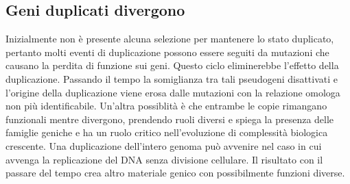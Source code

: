 \subsection{Geni duplicati divergono}
Inizialmente non \`e presente alcuna selezione per mantenere lo stato duplicato, pertanto molti eventi di duplicazione possono essere seguiti da mutazioni che causano la perdita di 
funzione sui geni. Questo ciclo eliminerebbe l'effetto della duplicazione. Passando il tempo la somiglianza tra tali pseudogeni disattivati e l'origine della duplicazione 
viene erosa dalle mutazioni con la relazione omologa non pi\`u identificabile. Un'altra possiblit\`a \`e che entrambe le copie rimangano funzionali mentre divergono, prendendo ruoli 
diversi e spiega la presenza delle famiglie geniche e ha un ruolo critico nell'evoluzione di complessit\`a biologica crescente. Una duplicazione dell'intero genoma pu\`o avvenire
nel caso in cui avvenga la replicazione del DNA senza divisione cellulare. Il risultato con il passare del tempo crea altro materiale genico con possibilmente funzioni diverse. 
